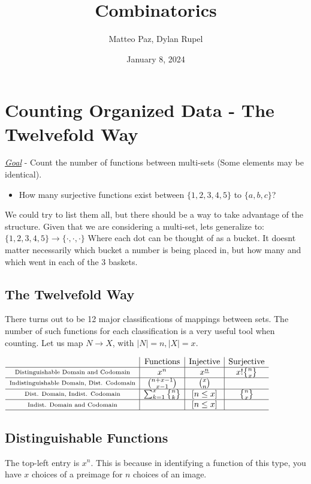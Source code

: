 \documentclass{article}
\author{Matteo Paz, Dylan Rupel}
\date{January 8, 2024}
\title{Combinatorics}
\begin{document}
\maketitle{}
\section{Counting Organized Data - The Twelvefold Way}
\emph{\underline{Goal}} - Count the number of functions between multi-sets (Some elements may be identical).
\begin{itemize}
    \item How many surjective functions exist between $\{1,2,3,4,5\}$ to $\{a,b,c\}$?
\end{itemize}
We could try to list them all, but there should be a way to take advantage of the structure. Given that 
we are considering a multi-set, lets generalize to: \\
$\{1,2,3,4,5\} \to \{\cdot, \cdot, \cdot\}$ Where each dot can be thought of as a bucket. It doesnt matter necessarily which bucket
a number is being placed in, but how many and which went in each of the 3 baskets.
\vspace{1em}

\subsection{The Twelvefold Way}

There turns out to be 12 major classifications of mappings between sets. The number of such functions for each classification is a
very useful tool when counting. Let us map
$N \to X$, with $|N| = n, |X| = x$.

$\begin{array}{c|c|c|c}
& \text{Functions} & \text{Injective} & \text{Surjective} \\ \hline
\substack{\text{Distinguishable Domain and Codomain}} & x^n & x^{\underline{n}} & x!{n \brace x} \\ \hline
\substack{\text{Indistinguishable Domain, Dist. Codomain}} & {n + x - 1 \choose x - 1} & {x \choose n} & \\ \hline
\substack{\text{Dist. Domain, Indist. Codomain}} & \sum^x_{k=1} {n \brace k} & [n \leq x] & {n \brace x} \\ \hline
\substack{\text{Indist. Domain and Codomain}} & & [n \leq x] & \\ \hline
\end{array}$

\subsection*{Distinguishable Functions}
The top-left entry is $x^n$. This is because in identifying a function of this type, you have $x$ choices of a preimage for $n$ choices of an image.
\end{document}
